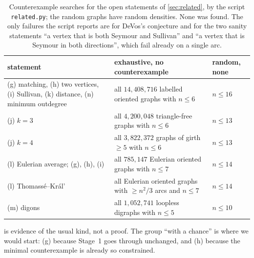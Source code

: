 \begin{table}[H]
\centering\small
\begin{tabular}{@{}p{}p{}p{}@{}}
\toprule
statement & exhaustive, no counterexample & random, none\\
\midrule
(g) matching, (h) two vertices, (i) Sullivan, (k) distance, (n) minimum outdegree
 & all $14{,}408{,}716$ labelled oriented graphs with $n\le6$ & $n\le16$\\
(j) $k=3$ & all $4{,}200{,}048$ triangle-free graphs with $n\le6$ & $n\le13$\\
(j) $k=4$ & all $3{,}822{,}372$ graphs of girth $\ge5$ with $n\le6$ & $n\le13$\\
(l) Eulerian average; (g), (h), (i) & all $785{,}147$ Eulerian oriented graphs with
 $n\le7$ & $n\le14$\\
(l) Thomass\'e--Kr\'al' & all Eulerian oriented graphs with $\ge n^2/3$ arcs and
 $n\le7$ & $n\le14$\\
(m) digons & all $1{,}052{,}741$ loopless digraphs with $n\le5$ & $n\le10$\\
\bottomrule
\end{tabular}
\caption{Counterexample searches for the open statements of \cref{sec:related}, by
the script \texttt{related.py}; the random graphs have random densities. None was
found. The only failures the script reports are for DeVos's conjecture and for the two
sanity statements ``a vertex that is both Seymour and Sullivan'' and ``a vertex that is
Seymour in both directions'', which fail already on a single arc.}
\label{tab:related}
\end{table}

 is evidence of the usual kind, not a proof. The group
``with a chance'' is where we would start: (g) because Stage~1 goes through unchanged,
and (h) because the minimal counterexample is already so constrained.
